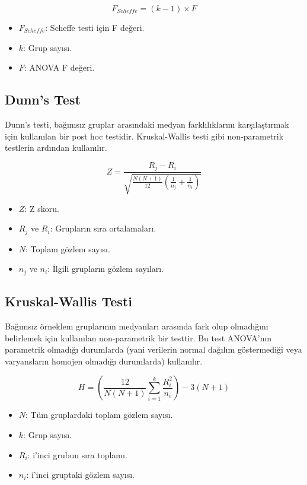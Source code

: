 \[ F_{Scheffe} = (k - 1) \times F \]

\begin{itemize}
	\item $F_{Scheffe}$: Scheffe testi için F değeri.
	\item $k$: Grup sayısı.
	\item $F$: ANOVA F değeri.
\end{itemize}

\newpage

\subsection{Dunn's Test}
Dunn's testi, bağımsız gruplar arasındaki medyan farklılıklarını karşılaştırmak için kullanılan bir post hoc testidir. Kruskal-Wallis testi gibi non-parametrik testlerin ardından kullanılır.

\[ Z = \frac{R_j - R_i}{\sqrt{\frac{N(N+1)}{12} \left(\frac{1}{n_j} + \frac{1}{n_i}\right)}} \]

\begin{itemize}
	\item $Z$: Z skoru.
	\item $R_j$ ve $R_i$: Grupların sıra ortalamaları.
	\item $N$: Toplam gözlem sayısı.
	\item $n_j$ ve $n_i$: İlgili grupların gözlem sayıları.
\end{itemize}

\newpage

\subsection{Kruskal-Wallis Testi}
Bağımsız örneklem gruplarının medyanları arasında fark olup olmadığını belirlemek için kullanılan non-parametrik bir testtir. Bu test ANOVA'nın parametrik olmadığı durumlarda (yani verilerin normal dağılım göstermediği veya varyansların homojen olmadığı durumlarda) kullanılır.

\[ H = \left( \frac{12}{N(N+1)} \sum_{i=1}^{k} \frac{R_i^2}{n_i} \right) - 3(N+1) \]

\begin{itemize}
	\item $N$: Tüm gruplardaki toplam gözlem sayısı.
	\item $k$: Grup sayısı.
	\item $R_i$: i'inci grubun sıra toplamı.
	\item $n_i$: i'inci gruptaki gözlem sayısı.
\end{itemize}

